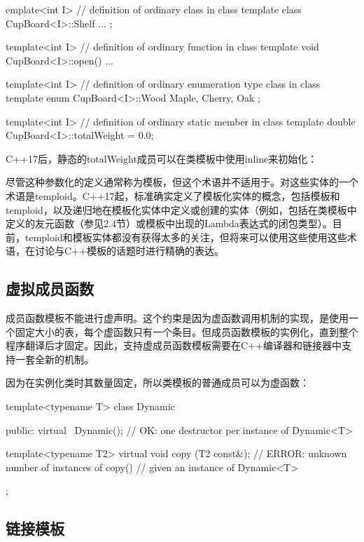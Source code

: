 \begin{cpp}
emplate<int I> // definition of ordinary class in class template
class CupBoard<I>::Shelf {
	...
};

template<int I> // definition of ordinary function in class template
void CupBoard<I>::open() {
	...
}

template<int I> // definition of ordinary enumeration type class in class template
enum CupBoard<I>::Wood {
	Maple, Cherry, Oak
};

template<int I> // definition of ordinary static member in class template
double CupBoard<I>::totalWeight = 0.0;
\end{cpp}

C++17后，静态的totalWeight成员可以在类模板中使用inline来初始化：

\begin{cpp}
template<int I>
class CupBoard
	...
	inline static double totalWeight = 0.0;
};
\end{cpp}

尽管这种参数化的定义通常称为模板，但这个术语并不适用于。对这些实体的一个术语是temploid。C++17起，标准确实定义了模板化实体的概念，包括模板和temploid，以及递归地在模板化实体中定义或创建的实体（例如，包括在类模板中定义的友元函数（参见2.4节）或模板中出现的Lambda表达式的闭包类型）。目前，temploid和模板实体都没有获得太多的关注，但将来可以使用这些使用这些术语，在讨论与C++模板的话题时进行精确的表达。

\subsection{虚拟成员函数}

成员函数模板不能进行虚声明。这个约束是因为虚函数调用机制的实现，是使用一个固定大小的表，每个虚函数只有一个条目。但成员函数模板的实例化，直到整个程序翻译后才固定。因此，支持虚成员函数模板需要在C++编译器和链接器中支持一套全新的机制。

因为在实例化类时其数量固定，所以类模板的普通成员可以为虚函数：

\begin{cpp}
template<typename T>
class Dynamic {
	public:
	virtual ~Dynamic(); // OK: one destructor per instance of Dynamic<T>
	
	template<typename T2>
	virtual void copy (T2 const&);
						// ERROR: unknown number of instances of copy()
						// given an instance of Dynamic<T>
};
\end{cpp}

\subsection{链接模板}

